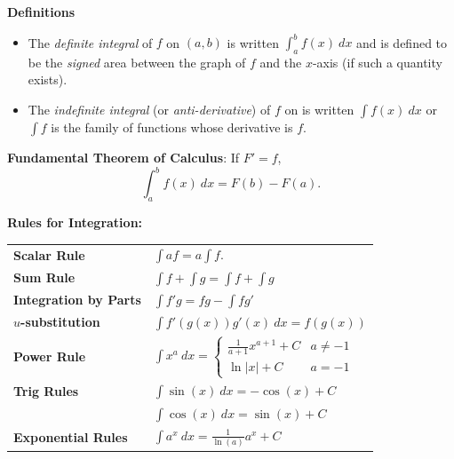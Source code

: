 \documentclass{article}
\newenvironment{bx}[1][]{
\begin{tcolorbox}[colback=white!97!black, title=#1, arc=0in, halign=flush left, left=1mm, right=1mm,]
}{
\end{tcolorbox}
}
\begin{document}
\newpage

\begin{multicols}{2}
\begin{bx}[Integration]
\textbf{Definitions}
\begin{itemize}
    \item The \textit{definite integral} of $f$ on $(a,b)$ is written $\int_a^bf(x)\ dx$ and is defined to be the \textit{signed} area between the graph of $f$ and the $x$-axis (if such a quantity exists).
    \item The \textit{indefinite integral} (or \textit{anti-derivative}) of $f$ on is written $\int f(x)\ dx$ or $\int f$ is the family of functions whose derivative is $f$.
\end{itemize}

\vspace{0.5em}

\textbf{Fundamental Theorem of Calculus}: If $F'=f$,
    $$\int_a^bf(x)\ dx = F(b)-F(a).$$

\textbf{Rules for Integration:}
\begin{center}
\def\arraystretch{1.5}
\begin{tabular}{@{}ll@{}}
\toprule[0.4mm]
\textbf{Scalar Rule} & $\int a f = a \int f$. \\
\textbf{Sum Rule} & $\int f + \int g= \int f + \int g$ \\
\textbf{Integration by Parts} & $\int f'g = fg - \int fg' $ \\
\textbf{$u$-substitution} & $\int f'(g(x))g'(x)\ dx =  f(g(x))$ \\
\midrule[0.4mm]
\textbf{Power Rule}
 & $\int x^a \ dx = \begin{cases}
\frac{1}{a+1}x^{a+1} + C & a \neq -1\\
\ln|x| + C & a = -1
\end{cases}$ \\
\textbf{Trig Rules}  & $\int \sin(x)\ dx = -\cos(x)+C$\\
                     & $\int \cos(x)\ dx = \sin(x)+C$ \\
\textbf{Exponential Rules} & $\int a^x\ dx = \frac{1}{\ln(a)}a^x+C$ \\
\bottomrule[0.4mm]
\end{tabular}
\end{center}

\vspace{0.5em}


\end{bx}
\end{multicols}
\end{document}
